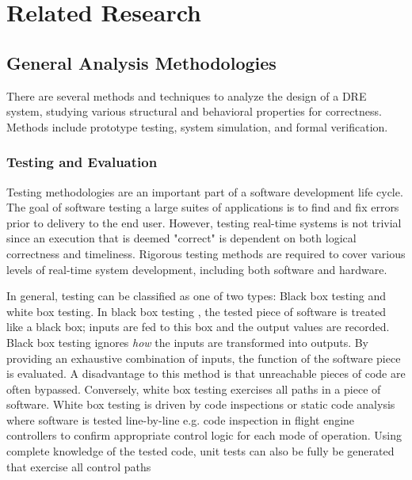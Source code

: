 \chapter{Related Research}
 \label{chapter:related-research}

 \section{General Analysis Methodologies}

There are several methods and techniques to analyze the design of a DRE system,
studying various structural and behavioral properties for correctness. Methods
include prototype testing, system simulation, and formal verification.

\subsection{Testing and Evaluation}

Testing methodologies are an important part of a software development life
cycle. The goal of software testing a large suites of applications is to find
and fix errors prior to delivery to the end user. However, testing real-time
systems is not trivial since an execution that is deemed "correct" is dependent
on both logical correctness and timeliness. Rigorous testing methods are
required to cover various levels of real-time system development, including both
software and hardware.

In general, testing can be classified as one of two types: Black box testing and
white box testing. In black box testing \cite{krichen2004black}, the tested
piece of software is treated like a black box; inputs are fed to this box and
the output values are recorded. Black box testing ignores \emph{how} the inputs
are transformed into outputs. By providing an exhaustive combination of inputs,
the function of the software piece is evaluated. A disadvantage to this method
is that unreachable pieces of code are often bypassed. Conversely, white box
testing exercises all paths in a piece of software. White box testing is driven
by code inspections or static code analysis where software is tested
line-by-line e.g. code inspection in flight engine controllers to confirm
appropriate control logic for each mode of operation. Using complete knowledge
of the tested code, unit tests can also be fully be generated that exercise all
control paths

